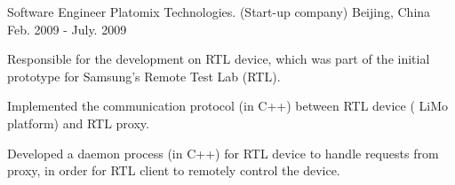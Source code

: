\begin{cventries}
  \cventry
    {Software Engineer} %
    {Platomix Technologies. (Start-up company)} %
    {Beijing, China} %
    {Feb. 2009 - July. 2009} %
    {
      \begin{cvitems} %
       \item {Responsible for the
    development on RTL device, which was part of the initial prototype for
    Samsung's Remote Test Lab (RTL).}
       \item {Implemented the communication protocol (in C++) between RTL device (
    LiMo platform) and RTL proxy.}
       \item {Developed a daemon process (in C++) for RTL
    device to handle requests from proxy, in order for RTL client
    to remotely control the device.}
      \end{cvitems}
    }

\end{cventries}

